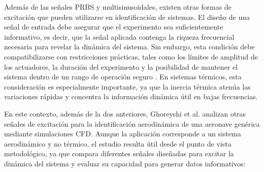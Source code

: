 \documentclass[11pt]{report}
\begin{document}
Además de las señales PRBS y multisinusoidales, existen otras formas de excitación que pueden utilizarse en identificación de sistemas. El diseño de una señal de entrada debe asegurar que el experimento sea suficientemente informativo, es decir, que la señal aplicada contenga la riqueza frecuencial necesaria para revelar la dinámica del sistema. Sin embargo, esta condición debe compatibilizarse con restricciones prácticas, tales como los límites de amplitud de los actuadores, la duración del experimento y la posibilidad de mantener el sistema dentro de un rango de operación seguro \cite{ljung1999system}. En sistemas térmicos, esta consideración es especialmente importante, ya que la inercia térmica atenúa las variaciones rápidas y concentra la información dinámica útil en bajas frecuencias.

En este contexto, además de la dos anteriores, Ghoreyshi et al. \cite{ghoreyshi2024design} analizan otras señales de excitación para la identificación aerodinámica de una aeronave genérica mediante simulaciones CFD. Aunque la aplicación corresponde a un sistema aerodinámico y no térmico, el estudio resulta útil desde el punto de vista metodológico, ya que compara diferentes señales diseñadas para excitar la dinámica del sistema y evaluar su capacidad para generar datos informativos:
\end{document}
